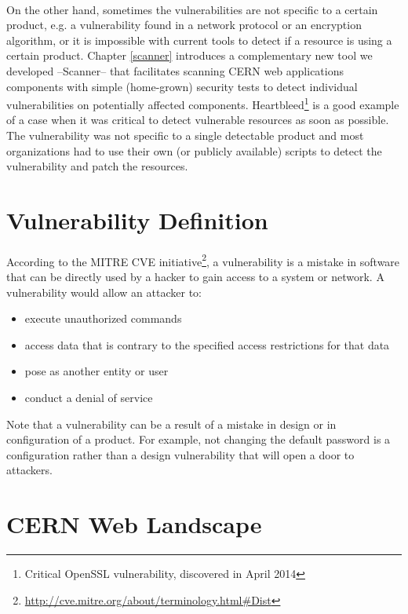 \paragraph{}
On the other hand, sometimes the vulnerabilities are not specific to a certain product, e.g. a vulnerability found in a network protocol or an encryption algorithm, or it is impossible with current tools to detect if a resource is using a certain product. Chapter \ref{scanner} introduces a complementary new tool we developed --Scanner-- that facilitates scanning CERN web applications components with simple (home-grown) security tests to detect individual vulnerabilities on potentially affected components. Heartbleed\footnote{Critical OpenSSL vulnerability, discovered in April 2014} is a good example of a case when it was critical to detect vulnerable resources as soon as possible. The vulnerability was not specific to a single detectable product and most organizations had to use their own (or publicly available) scripts to detect the vulnerability and patch the resources.

\section{Vulnerability Definition}
\paragraph{}
According to the MITRE CVE initiative\footnote{\url{http://cve.mitre.org/about/terminology.html\#Dist}}, a vulnerability is a mistake in software that can be directly used by a hacker to gain access to a system or network. A vulnerability would allow an attacker to:
\begin{itemize}
\item execute unauthorized commands
\item access data that is contrary to the specified access restrictions for that data
\item pose as another entity or user
\item conduct a denial of service
\end{itemize}

Note that a vulnerability can be a result of a mistake in design or in configuration of a product. For example, not changing the default password is a configuration rather than a design vulnerability that will open a door to attackers. 

\section{CERN Web Landscape}
